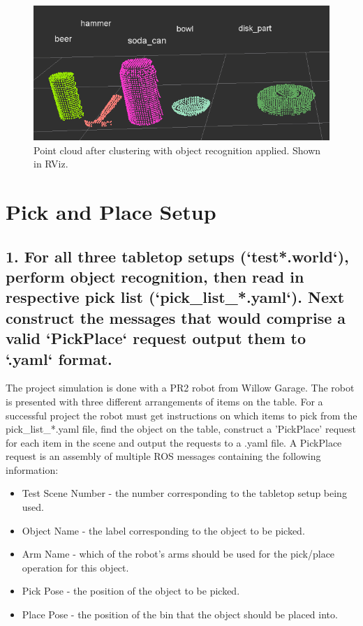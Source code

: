 \documentclass{article}
\begin{document}
\begin{figure}[H]
    \includegraphics[width=\linewidth]{classification.png}
    \caption{Point cloud after clustering with object recognition applied. Shown in RViz.}
    \label{fig:classification}
\end{figure}

\section{Pick and Place Setup}

\subsection{1. For all three tabletop setups (`test*.world`), perform object recognition, then read in respective pick list (`pick\_list\_*.yaml`). Next construct the messages that would comprise a valid `PickPlace` request output them to `.yaml` format.}\label{subsec:projintro}

The project simulation is done with a PR2 robot from Willow Garage. The robot is presented with three different arrangements of items on the table. For a successful project the robot must get instructions on which items to pick from the pick\_list\_*.yaml file, find the object on the table, construct a 'PickPlace' request for each item in the scene and output the requests to a .yaml file. A PickPlace request is an assembly of multiple ROS messages containing the following information:
\begin{itemize}
    \item Test Scene Number - the number corresponding to the tabletop setup being used.
    \item Object Name - the label corresponding to the object to be picked.
    \item Arm Name - which of the robot's arms should be used for the pick/place operation for this object.
    \item Pick Pose - the position of the object to be picked.
    \item Place Pose - the position of the bin that the object should be placed into.
\end{itemize}
\end{document}
